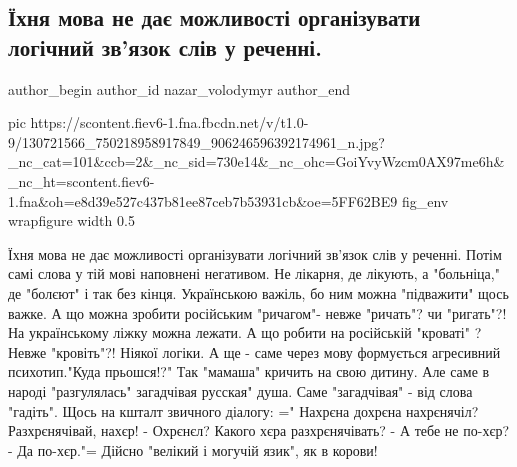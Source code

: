  
 
 
 
 
 
\subsection{Їхня мова не дає можливості організувати логічний зв'язок слів у реченні.}
\label{sec:08_12_2020.fb.nazar_volodymyr.2.ihnja_mova}
\ifcmt
	author_begin
   author_id nazar_volodymyr
	author_end
\fi

\ifcmt
pic https://scontent.fiev6-1.fna.fbcdn.net/v/t1.0-9/130721566_750218958917849_906246596392174961_n.jpg?_nc_cat=101&ccb=2&_nc_sid=730e14&_nc_ohc=GoiYvyWzcm0AX97me6h&_nc_ht=scontent.fiev6-1.fna&oh=e8d39e527c437b81ee87ceb7b53931cb&oe=5FF62BE9
fig_env wrapfigure
width 0.5
\fi

Їхня мова не дає можливості організувати логічний зв'язок слів у реченні. Потім
самі слова у тій мові наповнені негативом. Не лікарня, де лікують, а
"больніца," де "болєют" і так без кінця. Українською важіль, бо ним можна
"підважити" щось важке. А що можна зробити російським "ричагом"- невже
"ричать"? чи "ригать"?! На українському ліжку можна лежати. А що робити на
російській "кроваті" ? Невже "кровіть"?! Ніякої логіки. А ще - саме через мову
формується агресивний психотип."Куда прьошся!?" Так "мамаша" кричить на свою
дитину. Але саме в народі "разгулялась" загадчівая русская" душа. Саме
"загадчівая" - від слова "гадіть". Щось на кшталт звичного діалогу: =" Нахрєна
дохрєна нахрєнячіл? Разхрєнячівай, нахєр! - Охрєнєл? Какого хєра
разхрєнячівать? - А тебе не по-хєр? - Да по-хєр."= Дійсно "велікий і могучій
язик", як в корови!
